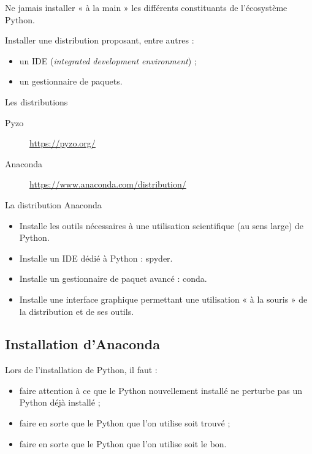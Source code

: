 \documentclass[10pt,aspectratio=169]{beamer}
\begin{document}
\begin{frame}
  Ne jamais installer « à la main » les différents constituants de l'écosystème Python.
  \begin{Conseil}
    Installer une \alert{distribution} proposant, entre autres :
    \begin{itemize}
    \item un \alert{IDE} (\emph{integrated development environment}) ;
    \item un \alert{gestionnaire de paquets}.
    \end{itemize}
  \end{Conseil}
\end{frame}

\begin{frame}{Les distributions}
  \begin{description}
  \item[Pyzo] \url{https://pyzo.org/}
  \item[Anaconda] \alert{\faHandPointRight[regular]}\url{https://www.anaconda.com/distribution/}\alert{\faHandPointLeft[regular]}
  \end{description}
\end{frame}

\begin{frame}{La distribution Anaconda}
  \begin{itemize}
  \item Installe les outils nécessaires à une \alert{utilisation scientifique} (au sens large) de Python.
  \item Installe un IDE dédié à Python : \alert{spyder}.
  \item Installe un gestionnaire de paquet avancé : \alert{conda}.
  \item Installe une \alert{interface graphique} permettant une utilisation « à la souris » de la distribution et de ses outils.
  \end{itemize}
\end{frame}

\subsection{Installation d'Anaconda}

\begin{frame}
  \begin{Attention}
    Lors de l'installation de Python, il faut :
    \begin{itemize}
    \item faire attention à ce que le Python nouvellement installé \alert{ne perturbe pas} un Python déjà installé ;
    \item faire en sorte que le Python que l'on utilise soit \alert{trouvé} ;
    \item faire en sorte que le Python que l'on utilise soit \alert{le bon}.
    \end{itemize}
  \end{Attention}
\end{frame}
\end{document}
